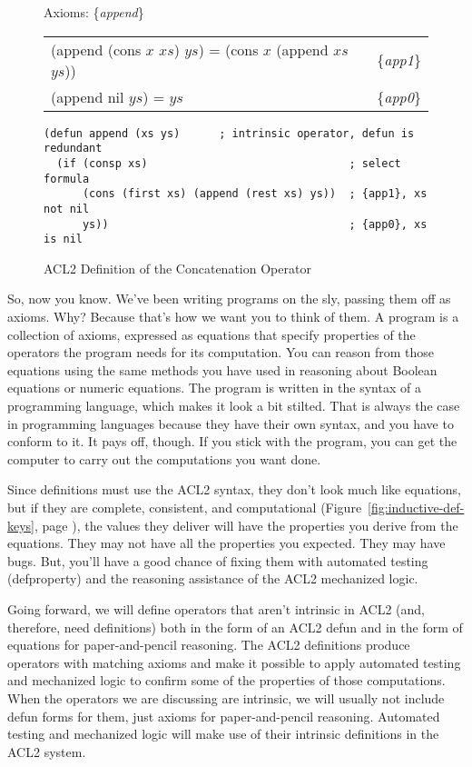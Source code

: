 \begin{figure}
\begin{center}
Axioms: \{\emph{append}\} \\
\begin{tabular}{ll}
(append (cons $x$ $xs$) $ys$) = (cons $x$ (append $xs$ $ys$)) & \{\emph{app1}\} \\
(append nil $ys$) =  $ys$                                     & \{\emph{app0}\} \\
\end{tabular}
\begin{Verbatim}
(defun append (xs ys)      ; intrinsic operator, defun is redundant
  (if (consp xs)                               ; select formula
      (cons (first xs) (append (rest xs) ys))  ; {app1}, xs not nil
      ys))                                     ; {app0}, xs is nil
\end{Verbatim}
\end{center}
\caption{ACL2 Definition of the Concatenation Operator}
\label{fig:append-defun}
\end{figure}

So, now you know. We've been writing programs on the sly,
passing them off as axioms.
Why? Because that's how we want you to think of them.
A program is a collection of axioms, expressed as equations
that specify properties of the operators the program needs for its computation.
You can reason from those equations using the same methods
you have used in reasoning about Boolean equations or numeric equations.
The program is written in the syntax of a programming language,
which makes it look a bit stilted.
That is always the case in programming languages because
they have their own syntax, and you have to conform to it.
It pays off, though.
If you stick with the program, you can get the computer to carry out
the computations you want done.

Since definitions must use the ACL2 syntax,
they don't look much like equations,
but if they are complete, consistent, and computational
(Figure~\ref{fig:inductive-def-keys}, page \pageref{fig:inductive-def-keys}),
the values they deliver will have the properties you derive
from the equations.
They may not have all the properties you expected.
They may have bugs.
But, you'll have a good chance of fixing them with
automated testing (defproperty)
and the reasoning assistance of the ACL2 mechanized logic.

Going forward, we will define operators that aren't
intrinsic in ACL2 (and, therefore, need definitions)
both in the form of an ACL2 defun
and in the form of equations for paper-and-pencil reasoning.
The ACL2 definitions produce operators with matching axioms and
make it possible to apply automated testing and mechanized logic
to confirm some of the properties of those computations.
When the operators we are discussing are intrinsic,
we will usually not include defun forms for them,
just axioms for paper-and-pencil reasoning.
Automated testing and mechanized logic will make use
of their intrinsic definitions in the ACL2 system.

